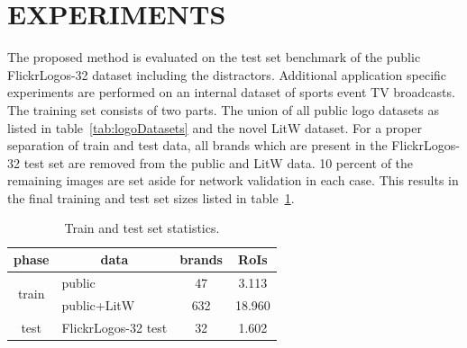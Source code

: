 \documentclass[a4paper,twoside]{article}
\begin{document}
\section{\uppercase{Experiments}}
%
\noindent The proposed method is evaluated on the test set benchmark of the public FlickrLogos-32 dataset including the distractors. Additional application specific experiments are performed on an internal dataset of sports event TV broadcasts. 
The training set consists of two parts. The union of all public logo datasets as listed in table~\ref{tab:logoDatasets} and the novel \ac{LitW} dataset. For a proper separation of train and test data, all brands which are present in the FlickrLogos-32 test set are removed from the public and \ac{LitW} data. 10 percent of the remaining images are set aside for network validation in each case. This results in the final training and test set sizes listed in table~\ref{tab:trainTestStatistics}.
%
\begin{table}[t]
\centering
\begingroup	
\setlength{\tabcolsep}{6pt}
\caption{Train and test set statistics.}
\label{tab:trainTestStatistics}
\begin{small}
\begin{tabular}{cl|cc}
\textbf{phase} & \multicolumn{1}{c|}{\textbf{data}} & \multicolumn{1}{c}{\textbf{brands}} & \multicolumn{1}{c}{\textbf{RoIs}} \bigstrut[b]\\
\hline
\multirow{2}[2]{*}{train} & public & 47    & 3.113 \bigstrut[t]\\
      & public+\ac{LitW} & 632   & 18.960 \bigstrut[b]\\
\hline
test  & FlickrLogos-32 test & 32    & 1.602 \bigstrut[t]\\
\end{tabular}%
\end{small}
\endgroup
\end{table}
\end{document}
